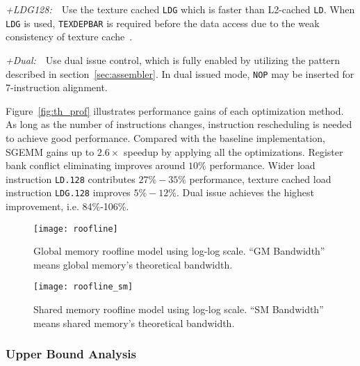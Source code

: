 {\it +LDG128:}~~Use the texture cached {\tt LDG} which is faster than L2-cached {\tt LD}. 
When {\tt LDG} is used, {\tt TEXDEPBAR} is required before the data access due to the weak consistency of texture cache~\cite{lukyanov2014efficient}.

{\it +Dual:}~~Use dual issue control, which is fully enabled by utilizing the pattern described in section~\ref{sec:assembler}.
In dual issued mode, {\tt NOP} may be inserted for 7-instruction alignment.

Figure~\ref{fig:th_prof} illustrates performance gains of each optimization method.
As long as the number of instructions changes, instruction rescheduling is needed to achieve good performance.
Compared with the baseline implementation, SGEMM gains up to $2.6\times$ speedup by applying all the optimizations.
Register bank conflict eliminating improves around $10\%$ performance. 
Wider load instruction {\tt LD.128} contributes $27\%-35\%$ performance, texture cached
load instruction {\tt LDG.128} improves $5\%-12\%$.
Dual issue achieves the highest improvement, i.e. 84\%-106\%.


\begin{figure}[htbp]
\begin{center}
\texttt{[image: roofline]}
    \caption{Global memory roofline model using log-log scale. ``GM Bandwidth'' means global memory's theoretical
    bandwidth.} %
\label{fig:roofline_global}
\end{center}
\end{figure}

\begin{figure}[htbp]
\begin{center}
\texttt{[image: roofline\_sm]}
    \caption{Shared memory roofline model using log-log scale. ``SM Bandwidth'' means shared memory's theoretical
    bandwidth. }%
\label{fig:roofline_shared}
\end{center}
\end{figure}

\subsubsection{Upper Bound Analysis}


